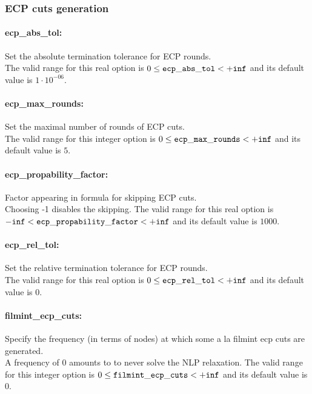\subsubsection{ECP cuts generation}
\label{sec:ECP_cuts_generation}

\paragraph{ecp\_abs\_tol:}\label{sec:ecp_abs_tol} Set the absolute termination tolerance for ECP rounds. $\;$ \\
 The valid range for this real option is 
$0 \le {\tt ecp\_abs\_tol } <  {\tt +inf}$
and its default value is $1 \cdot 10^{-06}$.


\paragraph{ecp\_max\_rounds:}\label{sec:ecp_max_rounds} Set the maximal number of rounds of ECP cuts. $\;$ \\
 The valid range for this integer option is
$0 \le {\tt ecp\_max\_rounds } <  {\tt +inf}$
and its default value is $5$.


\paragraph{ecp\_propability\_factor:}\label{sec:ecp_propability_factor} Factor appearing in formula for skipping ECP cuts. $\;$ \\
 Choosing -1 disables the skipping. The valid range for this real option is 
${\tt -inf} <  {\tt ecp\_propability\_factor } <  {\tt +inf}$
and its default value is $1000$.


\paragraph{ecp\_rel\_tol:}\label{sec:ecp_rel_tol} Set the relative termination tolerance for ECP rounds. $\;$ \\
 The valid range for this real option is 
$0 \le {\tt ecp\_rel\_tol } <  {\tt +inf}$
and its default value is $0$.


\paragraph{filmint\_ecp\_cuts:}\label{sec:filmint_ecp_cuts} Specify the frequency (in terms of nodes) at which some a la filmint ecp cuts are generated. $\;$ \\
 A frequency of 0 amounts to to never solve the
NLP relaxation. The valid range for this integer option is
$0 \le {\tt filmint\_ecp\_cuts } <  {\tt +inf}$
and its default value is $0$.

